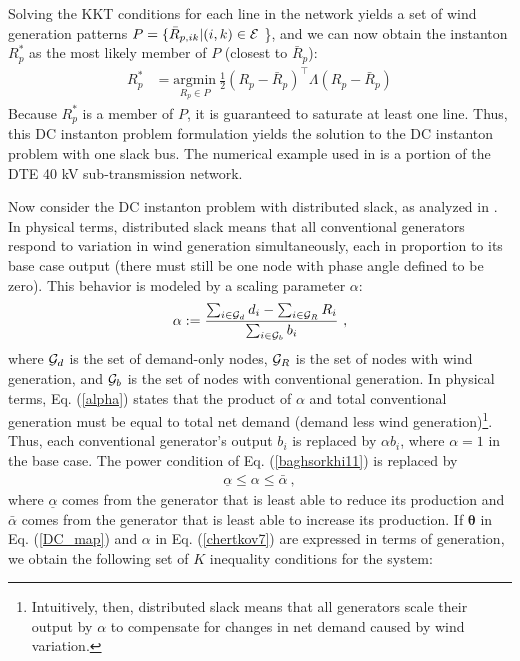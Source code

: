 Solving the KKT conditions for each line in the network yields a set of wind generation patterns $P=\{\bar{R}_{p,ik}|(i,k) \in {\cal E}$ \}, and we can now obtain the instanton $R_p^*$ as the most likely member of $P$ (closest to $\bar{R}_p$):
$$\begin{align}
R_p^* &= \underset{R_p \in P}{\text{argmin}}~\frac{1}{2}(R_p - \bar{R}_p)^\top \Lambda (R_p - \bar{R}_p)
\end{align}$$
Because $R_p^*$ is a member of $P$, it is guaranteed to saturate at least one line. Thus, this DC instanton problem formulation yields the solution to the DC instanton problem with one slack bus. The numerical example used in \cite{12BS} is a portion of the DTE 40 kV sub-transmission network.

Now consider the DC instanton problem with distributed slack, as analyzed in \cite{11CSPB}. In physical terms, distributed slack means that all conventional generators respond to variation in wind generation simultaneously, each in proportion to its base case output (there must still be one node with phase angle defined to be zero). This behavior is modeled by a scaling parameter $\alpha$:
$$\begin{align}
 \alpha := \frac{\sum_{i \in {\cal G}_d}d_i - \sum_{i \in {\cal G}_R}R_i}{\sum_{i \in {\cal G}_b}b_i}~,
\end{align}$$
where ${\cal G}_d$ is the set of demand-only nodes, ${\cal G}_R$ is the set of nodes with wind generation, and ${\cal G}_b$ is the set of nodes with conventional generation. In physical terms, Eq. (\ref{alpha}) states that the product of $\alpha$ and total conventional generation must be equal to total net demand (demand less wind generation)\footnote{Intuitively, then, distributed slack means that all generators scale their output by $\alpha$ to compensate for changes in net demand caused by wind variation.}. Thus, each conventional generator's output $b_i$ is replaced by $\alpha b_i$, where $\alpha = 1$ in the base case. The power condition of Eq. (\ref{baghsorkhi11}) is replaced by
$$\begin{align}
 \underline{\alpha} \leq \alpha \leq \bar{\alpha}~,
\end{align}$$
where $\underline{\alpha}$ comes from the generator that is least able to reduce its production and $\bar{\alpha}$ comes from the generator that is least able to increase its production. If $\mathbf{\theta}$ in Eq. (\ref{DC_map}) and $\alpha$ in Eq. (\ref{chertkov7}) are expressed in terms of generation, we obtain the following set of $K$ inequality conditions for the system:
